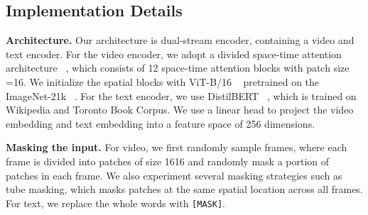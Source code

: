 \documentclass[10pt,twocolumn,letterpaper]{article}
\begin{document}
\begin{table*}[htb]
{\begin{tabular}
        \bottomrule
    \end{tabular}
	}\vspace{-2mm}
    \caption
    {Text-to-video retrieval results on ActivityNet(180s), DiDeMo(28s) and MSVD(10s) with various video duration. \textbf{Architecture}: , , and  are video, text, and cross-modal encoder, respectively.  is a uni-encoder for video and text.  are a set of experts for feature aggregation.  is a detector for ROI features.  is an encoder for prompt engineering.  is an encoder for the pretext task MCQ.  is an encoder for EMA updating. \textbf{\# Pairs} and \textbf{\# Frames} are the number of pairs and frames for pre-training. 
     }\vspace{-2mm}
    \label{table: i21k-activitynet-didemo-msvd}


\end{table*}

\vspace{-1mm}\subsection{Implementation Details}
\noindent\textbf{Architecture.} Our architecture is dual-stream encoder, containing a video and text encoder. For the video encoder, we adopt a divided space-time attention architecture ~\cite{timesformer, vivit}, which consists of 12 space-time attention blocks with patch size =16. We initialize the spatial blocks with ViT-B/16 ~\cite{vit} pretrained on the ImageNet-21k ~\cite{imagenet}. For the text encoder, we use DistilBERT ~\cite{distilbert}, which is trained on Wikipedia and Toronto Book Corpus. We use a linear head to project the video embedding and text embedding into a feature space of 256 dimensions. 

\vspace{1mm}\noindent\textbf{Masking the input.} For video, we first randomly sample  frames, where each frame is divided into  patches of size 1616 and randomly mask a portion of patches in each frame. We also experiment several masking strategies such as tube masking, which masks patches at the same spatial location across all frames. For text, we replace the whole words with \verb+[MASK]+. 
\end{document}
